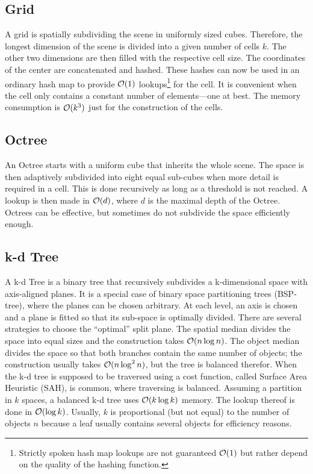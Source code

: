 \subsection{Grid}
A grid is spatially subdividing the scene in uniformly sized cubes. Therefore, the longest dimension of the scene is divided into a given number of cells $k$. The other two dimensions are then filled with the respective cell size. The coordinates of the center are concatenated and hashed. These hashes can now be used in an ordinary hash map to provide $\mathcal{O}(1)$ lookups\footnote{Strictly spoken hash map lookups are not guaranteed $\mathcal{O}(1)$ but rather depend on the quality of the hashing function.} for the cell. It is convenient when the cell only contains a constant number of elements---one at best. The memory consumption is $\mathcal{O}(k^3)$ just for the construction of the cells.

\subsection{Octree}

An Octree starts with a uniform cube that inherits the whole scene. The space is then adaptively subdivided into eight equal sub-cubes when more detail is required in a cell. This is done recursively as long as a threshold is not reached. A lookup is then made in $\mathcal{O}(d)$, where $d$ is the maximal depth of the Octree. Octrees can be effective, but sometimes do not subdivide the space efficiently enough.

\subsection{k-d Tree}

A k-d Tree is a binary tree that recursively subdivides a k-dimensional space with axis-aligned planes. It is a special case of binary space partitioning trees (BSP-tree), where the planes can be chosen arbitrary. At each level, an axis is chosen and a plane is fitted so that its sub-space is optimally divided. There are several strategies to choose the \enquote{optimal} split plane. The spatial median divides the space into equal sizes and the construction takes $\mathcal{O}(n\log n)$. The object median divides the space so that both branches contain the same number of objects; the construction usually takes $\mathcal{O}(n \log^2 n)$, but the tree is balanced therefor. When the k-d tree is supposed to be traversed using a cost function, called Surface Area Heuristic (SAH), is common, where traversing is balanced. Assuming a partition in $k$ spaces, a balanced k-d tree uses $\mathcal{O}(k \log k)$ memory. The lookup thereof is done in $\mathcal{O}(\log k)$. Usually, $k$ is proportional (but not equal) to the number of objects $n$ because a leaf usually contains several objects for efficiency reasons.

